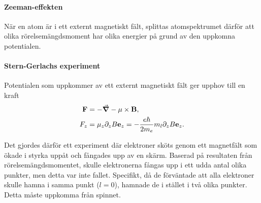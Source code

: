 \paragraph{Zeeman-effekten}
När en atom är i ett externt magnetiskt fält, splittas atomspektrumet därför att olika rörelsemängdsmoment har olika energier på grund av den uppkomna potentialen.

\paragraph{Stern-Gerlachs experiment}
Potentialen som uppkommer av ett externt magnetiskt fält ger upphov till en kraft
\begin{align*}
	\vb{F} &= -\grad{-\vb{\mu}\times\vb{B}}, \\
	F_{z}  &= \mu_{z}\partial_{z}B\vb{e}_{z} = -\frac{e\hbar}{2m_{e}}m_{l}\partial_{z}B\vb{e}_{z}.
\end{align*}

Det gjordes därför ett experiment där elektroner sköts genom ett magnetfält som ökade i styrka uppåt och fångades upp av en skärm. Baserad på resultaten från rörelsemängdsmomentet, skulle elektronerna fångas upp i ett udda antal olika punkter, men detta var inte fallet. Specifikt, då de förväntade att alla elektroner skulle hamna i samma punkt ($l = 0$), hamnade de i stället i två olika punkter. Detta måste uppkomma från spinnet.